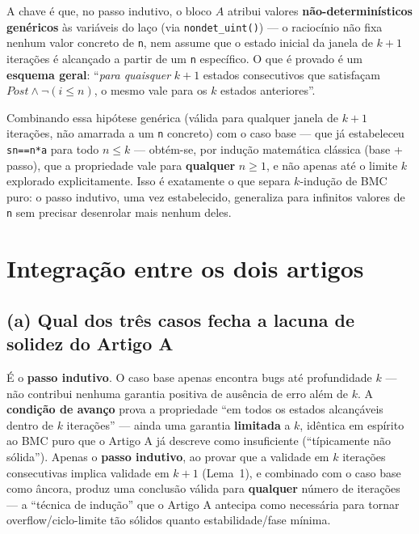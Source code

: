 \documentclass[12pt,a4paper]{article}
\newcommand{\vv}[1]{\texttt{#1}}
\begin{document}
A chave \'e que, no passo indutivo, o bloco $A$ atribui valores \textbf{n\~ao-determin\'isticos
gen\'ericos} \`as vari\'aveis do la\c{c}o (via \vv{nondet\_uint()}) --- o racioc\'inio n\~ao
fixa nenhum valor concreto de \vv{n}, nem assume que o estado inicial da janela de $k+1$
itera\c{c}\~oes \'e alcan\c{c}ado a partir de um \vv{n} espec\'ifico. O que \'e provado \'e um
\textbf{esquema geral}: ``\emph{para quaisquer} $k{+}1$ estados consecutivos que satisfa\c{c}am
$Post\wedge\neg(i\le n)$, o mesmo vale para os $k$ estados anteriores''.

\begin{tcolorbox}[resultbox]
Combinando essa hip\'otese gen\'erica (v\'alida para qualquer janela de $k{+}1$ itera\c{c}\~oes,
n\~ao amarrada a um \vv{n} concreto) com o caso base --- que j\'a estabeleceu
\vv{sn==n*a} para todo $n\le k$ --- obt\'em-se, por indu\c{c}\~ao matem\'atica cl\'assica
(base + passo), que a propriedade vale para \textbf{qualquer} $n\ge1$, e n\~ao apenas at\'e o
limite $k$ explorado explicitamente. Isso \'e exatamente o que separa $k$-indu\c{c}\~ao de BMC
puro: o passo indutivo, uma vez estabelecido, generaliza para infinitos valores de \vv{n} sem
precisar desenrolar mais nenhum deles.
\end{tcolorbox}

\newpage

\section{Integração entre os dois artigos}

\subsection{(a) Qual dos três casos fecha a lacuna de solidez do Artigo A}

\'E o \textbf{passo indutivo}. O caso base apenas encontra bugs at\'e profundidade $k$ ---
n\~ao contribui nenhuma garantia positiva de aus\^encia de erro al\'em de $k$. A
\textbf{condi\c{c}\~ao de avan\c{c}o} prova a propriedade ``em todos os estados alcan\c{c}\'aveis
dentro de $k$ itera\c{c}\~oes'' --- ainda uma garantia \textbf{limitada} a $k$, id\^entica em
esp\'irito ao BMC puro que o Artigo A j\'a descreve como insuficiente (``t\'ipicamente n\~ao
s\'olida''). Apenas o \textbf{passo indutivo}, ao provar que a validade em $k$ itera\c{c}\~oes
consecutivas implica validade em $k{+}1$ (Lema~1), e combinado com o caso base como \^ancora,
produz uma conclus\~ao v\'alida para \textbf{qualquer} n\'umero de itera\c{c}\~oes --- a
``t\'ecnica de indu\c{c}\~ao'' que o Artigo A antecipa como necess\'aria para tornar
overflow/ciclo-limite tão s\'olidos quanto estabilidade/fase m\'inima.
\end{document}
